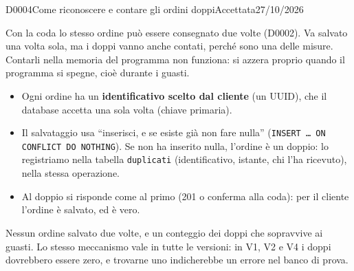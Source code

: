 \begin{decisione}{D0004}{Come riconoscere e contare gli ordini doppi}{Accettata}{27/10/2026}

\contesto
Con la coda lo stesso ordine può essere consegnato due volte (D0002). Va salvato una volta sola, ma i doppi vanno anche contati, perché sono una delle misure. Contarli nella memoria del programma non funziona: si azzera proprio quando il programma si spegne, cioè durante i guasti.

\scelta
\begin{itemize}
  \item Ogni ordine ha un \textbf{identificativo scelto dal cliente} (un UUID), che il database accetta una sola volta (chiave primaria).
  \item Il salvataggio usa ``inserisci, e se esiste già non fare nulla'' (\texttt{INSERT \ldots\ ON CONFLICT DO NOTHING}). Se non ha inserito nulla, l'ordine è un doppio: lo registriamo nella tabella \texttt{duplicati} (identificativo, istante, chi l'ha ricevuto), nella stessa operazione.
  \item Al doppio si risponde come al primo (201 o conferma alla coda): per il cliente l'ordine è salvato, ed è vero.
\end{itemize}

\conseguenze
Nessun ordine salvato due volte, e un conteggio dei doppi che sopravvive ai guasti. Lo stesso meccanismo vale in tutte le versioni: in V1, V2 e V4 i doppi dovrebbero essere zero, e trovarne uno indicherebbe un errore nel banco di prova.

\end{decisione}
